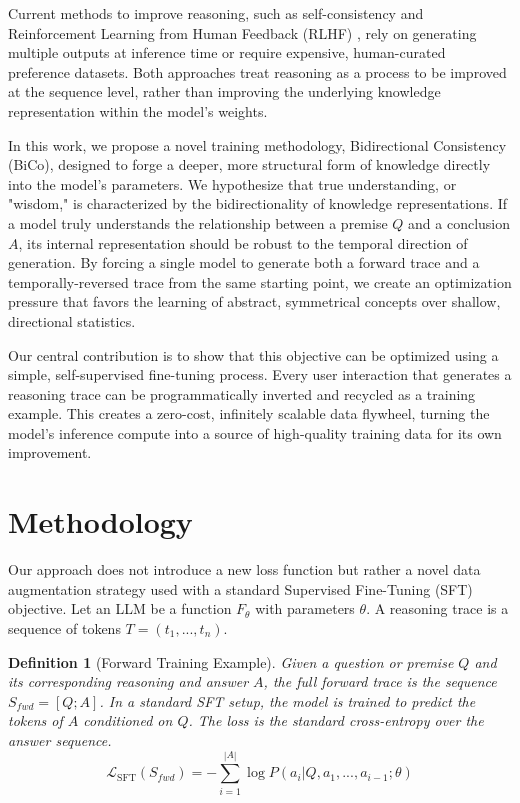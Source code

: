 \documentclass[11pt]{article}
\newtheorem{definition}{Definition}
\begin{document}
Current methods to improve reasoning, such as self-consistency \cite{wang2022self} and Reinforcement Learning from Human Feedback (RLHF) \cite{christiano2017deep}, rely on generating multiple outputs at inference time or require expensive, human-curated preference datasets. Both approaches treat reasoning as a process to be improved at the sequence level, rather than improving the underlying knowledge representation within the model's weights.

In this work, we propose a novel training methodology, Bidirectional Consistency (BiCo), designed to forge a deeper, more structural form of knowledge directly into the model's parameters. We hypothesize that true understanding, or "wisdom," is characterized by the bidirectionality of knowledge representations. If a model truly understands the relationship between a premise $Q$ and a conclusion $A$, its internal representation should be robust to the temporal direction of generation. By forcing a single model to generate both a forward trace and a temporally-reversed trace from the same starting point, we create an optimization pressure that favors the learning of abstract, symmetrical concepts over shallow, directional statistics.

Our central contribution is to show that this objective can be optimized using a simple, self-supervised fine-tuning process. Every user interaction that generates a reasoning trace can be programmatically inverted and recycled as a training example. This creates a zero-cost, infinitely scalable data flywheel, turning the model's inference compute into a source of high-quality training data for its own improvement.

\section{Methodology}
Our approach does not introduce a new loss function but rather a novel data augmentation strategy used with a standard Supervised Fine-Tuning (SFT) objective. Let an LLM be a function $F_\theta$ with parameters $\theta$. A reasoning trace is a sequence of tokens $T = (t_1, ..., t_n)$.

\begin{definition}[Forward Training Example]
Given a question or premise $Q$ and its corresponding reasoning and answer $A$, the full forward trace is the sequence $S_{fwd} = [Q; A]$. In a standard SFT setup, the model is trained to predict the tokens of $A$ conditioned on $Q$. The loss is the standard cross-entropy over the answer sequence.
\[ \mathcal{L}_{\text{SFT}}(S_{fwd}) = -\sum_{i=1}^{|A|} \log P(a_i | Q, a_1, ..., a_{i-1}; \theta) \]
\end{definition}
\end{document}
